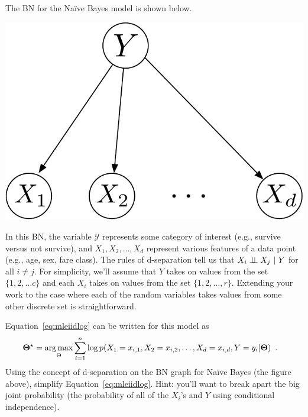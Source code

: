 \documentclass[assignment04_Solutions]{subfiles}
\begin{document}
\vspace{1em}
\begin{exercise}[(60 minutes)]
The BN for the Na\"ive Bayes model is shown below.

\begin{center}
\includegraphics[width=0.3\linewidth]{figures/naivebayesgm}
\end{center}

In this BN, the variable $\mathcal{Y}$ represents some category of interest (e.g., survive versus not survive), and $X_1, X_2, \ldots, X_d$ represent various features of a data point (e.g., age, sex, fare class).  The rules of d-separation tell us that $X_i \perp\!\!\!\perp X_j~|~Y$ for all $i \neq j$.  For simplicity, we'll assume that $Y$ takes on values from the set $\{1, 2, \ldots c \}$ and each $X_i$ takes on values from the set $\{1, 2, \ldots, r\}$.  Extending your work to the case where each of the random variables takes values from some other discrete set is straightforward.


\bes
\item Equation~\ref{eq:mleiidlog} can be written for this model as
\begin{align}
\mathbf{\Theta^\star} &= \operatorname*{arg\,max}_{\Theta} \sum_{i=1}^n \log p(X_1 = x_{i,1}, X_2 = x_{i,2}, \ldots, X_d = x_{i,d}, Y = y_i | \mathbf{\Theta}) \enspace . \label{eq:nbmle}
\end{align}
Using the concept of d-separation on the BN graph for Na\"ive Bayes (the figure above), simplify Equation~\ref{eq:mleiidlog}.  Hint: you'll want to break apart the big joint probability (the probability of all of the $X_i$'s and $Y$ using conditional independence). %


\end{exercise}
\end{document}
